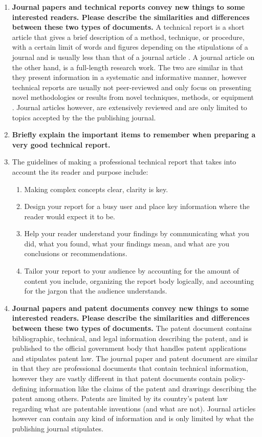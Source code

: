\documentclass{article}
\begin{document}
\begin{enumerate}
  \item \textbf{Journal papers and technical reports convey new things to some interested readers. Please describe the similarities and differences between these two types of documents.}
  \subitem A technical report is a short article that gives a brief description of a method, technique, or procedure, with a certain limit of words and figures depending on the stipulations of a journal and is usually less than that of a journal article \citep{ng_writing_2010}. A journal article on the other hand, is a full-length research work. 
  \subitem The two are similar in that they present information in a systematic and informative manner, however technical reports are usually not peer-reviewed and only focus on presenting novel methodologies or results from novel techniques, methods, or equipment \citep{ng_writing_2010}. Journal articles however, are extensively reviewed and are only limited to topics accepted by the the publishing journal.
  \newpage
  \item \textbf{Briefly explain the important items to remember when preparing a very good technical report.}
  \item[] The guidelines of making a professional technical report that takes into account the its reader and purpose include:
  \begin{enumerate}
    \item Making complex concepts clear, clarity is key.
    \item Design your report for a busy user and place key information where the reader would expect it to be.
    \item Help your reader understand your findings by communicating what you did, what you found, what your findings mean, and what are you conclusions or recommendations.
    \item Tailor your report to your audience by accounting for the amount of content you include, organizing the report body logically, and accounting for the jargon that the audience understands.
  \end{enumerate}

  \item \textbf{Journal papers and patent documents convey new things to some interested readers. Please describe the similarities and differences between these two types of documents.}
  \subitem The patent document contains bibliographic, technical, and legal information describing the patent, and is published to the official government body that handles patent applications and stipulates patent law.
  \subitem The journal paper and patent document are similar in that they are professional documents that contain technical information, however they are vastly different in that patent documents contain policy-defining information like the claims of the patent and drawings describing the patent among others. Patents are limited by its country's patent law regarding what are patentable inventions (and what are not).
  \subitem Journal articles however can contain any kind of information and is only limited by what the publishing journal stipulates.


\end{enumerate}
\end{document}
